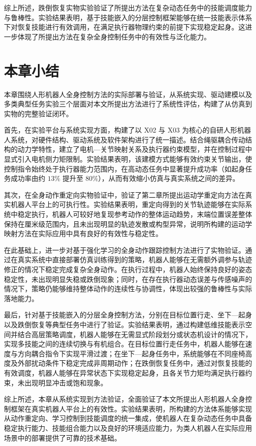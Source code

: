 综上所述，跌倒恢复实物实验验证了所提出方法在复杂动态任务中的技能调度能力与鲁棒性。实验结果表明，基于技能嵌入的分层控制框架能够在统一技能表示体系下对恢复技能进行有效调用，在满足执行器物理约束的前提下实现稳定起身。这进一步体现了所提出方法在复杂全身控制任务中的有效性与泛化能力。



\section{本章小结}

本章围绕人形机器人全身控制方法的实际部署与验证，从系统实现、驱动建模以及多类典型任务实验三个层面对本文所提出方法进行了系统性评估，构建了从仿真到实物的完整验证闭环。

首先，在实验平台与系统实现方面，构建了以 X02 与 X03 为核心的自研人形机器人系统，对硬件结构、驱动系统及软件架构进行了统一描述。结合绳驱耦合传动结构的动力学特性，建立了电机—关节映射关系及执行器约束模型，并在控制过程中显式引入电机侧力矩限制。实验结果表明，该建模方式能够有效约束关节输出，使控制指令始终处于执行器能力范围内，在高动态任务中显著提升成功率（如起身任务成功率由约 $13\%$ 提升至 $80\%$），从而有效缩小仿真与真实系统之间的差异。

其次，在全身动作重定向实物验证中，验证了第二章所提出运动学重定向方法在真实机器人平台上的可执行性。实验结果表明，重定向得到的关节轨迹能够在实际系统中稳定执行，机器人可较好地复现参考动作的整体运动趋势，末端位置误差整体保持在厘米级范围内，且未出现明显的轨迹发散或构型异常，说明所构建的运动学映射方法在实际应用中具有良好的有效性与稳定性。

在此基础上，进一步对基于强化学习的全身动作跟踪控制方法进行了实物验证。通过在真实系统中直接部署仿真训练得到的策略，机器人能够在无需额外调参与轨迹修正的情况下稳定完成复杂全身动作。在执行过程中，机器人始终保持良好的姿态稳定性，未出现明显失稳或跌倒现象；同时，在存在执行器动态误差与传感噪声的情况下，策略仍能够维持整体动作的连续性与协调性，体现出较强的鲁棒性与实际落地能力。

最后，针对基于技能嵌入的分层全身控制方法，分别在目标位置行走、坐下—起身以及跌倒恢复等典型任务中进行了验证。实验结果表明，通过构建低维技能表示空间并结合高层策略调度，机器人能够在无需显式阶段划分或状态机设计的情况下，实现多技能之间的连续切换与有机组合。在目标位置行走任务中，机器人能够在速度与方向耦合指令下实现平滑过渡；在坐下—起身任务中，系统能够在不同座椅高度及外部扰动条件下稳定完成非周期动作；在跌倒恢复任务中，通过对恢复技能的有效调度，机器人能够在异常状态下实现稳定起身，且各关节力矩均满足执行器约束，未出现明显冲击或饱和现象。

综上所述，本章从系统实现到方法验证，全面验证了本文所提出人形机器人全身控制框架在真实机器人平台上的有效性。实验结果表明，所构建的方法体系能够实现从动作重定向、学习控制到技能调度的统一集成，使机器人在复杂动态任务中具备稳定执行能力、技能组合能力以及良好的环境适应能力，为类人机器人在实际应用场景中的部署提供了可靠的技术基础。
